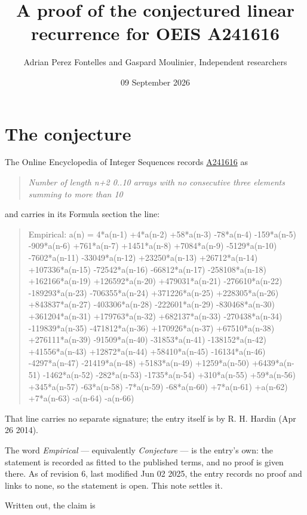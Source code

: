 \documentclass[11pt]{article}
\title{A proof of the conjectured linear recurrence for OEIS A241616}
\author{Adrian Perez Fontelles and Gaspard Moulinier, Independent researchers}
\date{09 September 2026}
\theoremstyle{definition}
\begin{document}
\maketitle
\section{The conjecture}

The Online Encyclopedia of Integer Sequences records \href{https://oeis.org/A241616}{A241616} as

\begin{quote}\itshape Number of length n+2 0..10 arrays with no consecutive three elements summing to more than 10\end{quote}

and carries in its Formula section the line:

\begin{quote}\ttfamily Empirical: a(n) = 4*a(n-1) +4*a(n-2) +58*a(n-3) -78*a(n-4) -159*a(n-5) -909*a(n-6) +761*a(n-7) +1451*a(n-8) +7084*a(n-9) -5129*a(n-10) -7602*a(n-11) -33049*a(n-12) +23250*a(n-13) +26712*a(n-14) +107336*a(n-15) -72542*a(n-16) -66812*a(n-17) -258108*a(n-18) +162166*a(n-19) +126592*a(n-20) +479031*a(n-21) -276610*a(n-22) -189293*a(n-23) -706355*a(n-24) +371226*a(n-25) +228305*a(n-26) +843837*a(n-27) -403306*a(n-28) -222601*a(n-29) -830468*a(n-30) +361204*a(n-31) +179763*a(n-32) +682137*a(n-33) -270438*a(n-34) -119839*a(n-35) -471812*a(n-36) +170926*a(n-37) +67510*a(n-38) +276111*a(n-39) -91509*a(n-40) -31853*a(n-41) -138152*a(n-42) +41556*a(n-43) +12872*a(n-44) +58410*a(n-45) -16134*a(n-46) -4297*a(n-47) -21419*a(n-48) +5183*a(n-49) +1259*a(n-50) +6439*a(n-51) -1462*a(n-52) -282*a(n-53) -1735*a(n-54) +310*a(n-55) +59*a(n-56) +345*a(n-57) -63*a(n-58) -7*a(n-59) -68*a(n-60) +7*a(n-61) +a(n-62) +7*a(n-63) -a(n-64) -a(n-66)\end{quote}

That line carries no separate signature; the entry itself is by R. H. Hardin (Apr 26 2014).

The word {\itshape Empirical} --- equivalently {\itshape Conjecture} --- is the entry's own: the statement is recorded as fitted to the published terms, and no proof is given there. As of revision 6, last modified Jun 02 2025, the entry records no proof and links to none, so the statement is open. This note settles it.

Written out, the claim is
\end{document}
